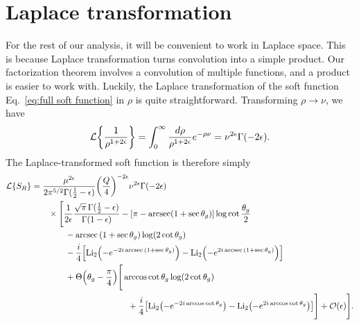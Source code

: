 \documentclass[11pt,twoside,reqno]{amsart}
\theoremstyle{plain}
\theoremstyle{remark}
\theoremstyle{definition}
\theoremstyle{remark}
\theoremstyle{definition}
\theoremstyle{definition}
\newcommand{\cL}{\mathcal{L}}
\newcommand{\cO}{\mathcal{O}}
\newcommand{\Li}{\mathrm{Li}}
\begin{document}
\section{Laplace transformation}
	For the rest of our analysis, it will be convenient to work in Laplace space. This is because Laplace transformation turns convolution into a simple product. Our factorization theorem involves a convolution of multiple functions, and a product is easier to work with. Luckily, the Laplace transformation of the soft function Eq.~\ref{eq:full soft function} in $\rho$ is quite straightforward. Transforming $\rho \to \nu$, we have
	\begin{equation}
		\cL\qty{\frac{1}{\rho^{1+2\epsilon}}} = \int_0^\infty \frac{d\rho}{\rho^{1+2\epsilon}} e^{-\rho\nu} = \nu^{2\epsilon} \Gamma(-2\epsilon).
	\end{equation}
	The Laplace-transformed soft function is therefore simply
	\begin{equation}
	\begin{aligned}
		\cL\qty{S_R} &= \frac{\mu^{2\epsilon}}{2\pi^{5/2} \Gamma(\frac{1}{2} - \epsilon)}\qty(\frac{Q}{4})^{-2\epsilon} \nu^{2\epsilon} \Gamma(-2\epsilon) \\
			&\qquad\times \Bigg[\frac{1}{2\epsilon}\frac{\sqrt{\pi} \, \Gamma(\frac{1}{2} - \epsilon)}{\Gamma(1 - \epsilon)} - \qty[\pi - \arcsec(1 + \sec\theta_g)]\log\cot\frac{\theta_g}{2} \\
			&\qquad\qquad - \arcsec\qty(1 + \sec\theta_g) \log(2\cot\theta_g) \\
			&\qquad\qquad - \frac{i}{4}\qty[\Li_2\qty(-e^{-2i\arcsec\qty(1 + \sec\theta_g)}) - \Li_2\qty(-e^{2i\arcsec\qty(1 + \sec\theta_g)})] \\
			&\qquad\qquad+ \Theta\qty(\theta_g - \frac{\pi}{4})\Bigg[ \arccos\cot\theta_g \log(2\cot\theta_g) \\
			&\hspace{4cm}+ \frac{i}{4}\qty[\Li_2\qty(-e^{-2i\arccos\cot\theta_g}) - \Li_2\qty(-e^{2i\arccos\cot\theta_g})] \Bigg] + \cO(\epsilon) \Bigg].
	\end{aligned}
	\end{equation}
\end{document}
